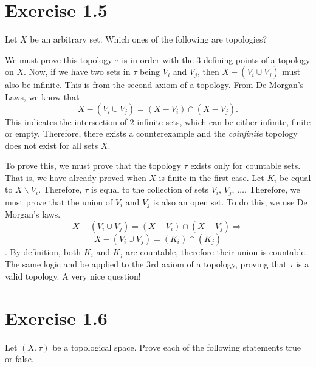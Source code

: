 \documentclass{report}
\begin{document}
\section{Exercise 1.5}
\begin{center}
Let $X$ be an arbitrary set. Which ones of the following are topologies?
\end{center}

\sol We must prove this topology $\tau$ is in order with the $3$ defining points of a topology on $X$. 
Now, if we have two sets in $\tau$ being $V_i$ and $V_j$, then $X - (V_i \cup V_j)$ must also be infinite. This is from the second axiom of a topology. From De Morgan's Laws, we know that
                    \[
                        X - ( V_i \cup V_j ) = (X - V_i) \cap (X - V_j).                  
                    \]
This indicates the intersection of $2$ infinite sets, which can be either infinite, finite or empty. Therefore, there exists a counterexample and the \textit{coinfinite} topology does not exist for all sets $X$. 

\sol To prove this, we must prove that the topology $\tau$ exists only for countable sets. That is, we have already proved when $X$ is finite in the first case. Let $K_i$ be equal to $X \backslash V_i$. Therefore, $\tau$ is equal to the collection of sets $V_i$, $V_j$, $\dots$. Therefore, we must prove that the union of $V_i$ and $V_j$ is also an open set. To do this, we use De Morgan's laws.
                    \[X - (V_i \cup V_j) = (X-V_i) \cap (X-V_j) \Longrightarrow  \]
                    \[X - (V_i \cup V_j) = (K_i) \cap (K_j) \].
By definition, both $K_i$ and $K_j$ are countable, therefore their union is countable. The same logic and be applied to the $3$rd axiom of a topology, proving that $\tau$ is a valid topology. A very nice question!                            

\section{Exercise 1.6}
\begin{center}
    Let $(X, \tau)$ be a topological space. Prove each of the following statements true or false.         
\end{center}
    
\end{document}
